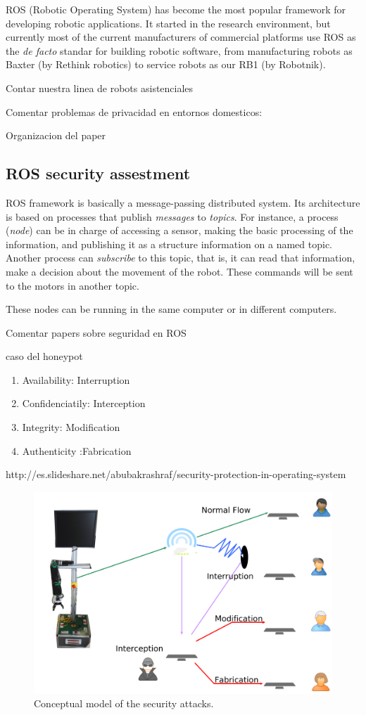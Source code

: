 \documentclass[journal,twoside]{JoPhA}
\begin{document}
ROS (Robotic Operating System) \cite{ROS09} has become the most popular framework for developing robotic applications. It started in the research environment, but currently most of the current manufacturers of commercial platforms use ROS as the {\em de facto} standar for building robotic software, from manufacturing robots as Baxter (by Rethink robotics) to service robots as our RB1 (by Robotnik).

Contar nuestra linea de robots asistenciales \cite{lera}

Comentar problemas de privacidad en entornos domesticos: \cite{Denning09}

Organizacion del paper




\subsection{ROS security assestment}

ROS framework is basically a message-passing distributed system. Its architecture is based on processes that publish {\em messages} to {\em topics}. For instance, a process ({\em node}) can be in charge of accessing a sensor, making the basic processing of the information, and publishing it as a structure information on a named topic. Another process can {\em subscribe} to this topic, that is, it can read that information, make a decision about the movement of the robot. These commands will be sent to the motors in another topic.

These nodes can be running in the same computer or in different computers. 

Comentar papers sobre seguridad en ROS 

caso del honeypot \cite{McClean2013}



\begin{enumerate}
 \item Availability: Interruption
 \item Confidenciatily: Interception
 \item Integrity: Modification
 \item Authenticity :Fabrication
\end{enumerate}


http://es.slideshare.net/abubakrashraf/security-protection-in-operating-system

\begin{figure}[ht]
    \centering
    \includegraphics[width=.5\textwidth]{SecurityAttacks.pdf}
    \caption{Conceptual model of the security attacks.}
  \label{fig:Conceptualmodel}
\end{figure}
\end{document}
